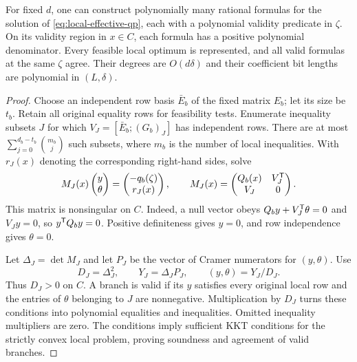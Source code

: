 \begin{lemma}\label{lem:local-branches}
For fixed $d$, one can construct polynomially many rational formulas
for the solution of \eqref{eq:local-effective-qp}, each with a polynomial
validity predicate in $\zeta$. On its validity region in $x\in C$, each
formula has a positive polynomial denominator. Every feasible local
optimum is represented, and all valid formulas at the same $\zeta$
agree. Their degrees are $O(d\delta)$ and their coefficient bit lengths
are polynomial in $(L,\delta)$.
\end{lemma}
\begin{proof}
Choose an independent row basis $\bar E_b$ of the fixed matrix $E_b$;
let its size be $t_b$. Retain all original equality rows for feasibility
tests. Enumerate inequality subsets $J$ for which
$V_J=[\bar E_b;(G_b)_J]$ has independent rows. There are at most
$\sum_{j=0}^{d_b-t_b}\binom{m_b}{j}$ such subsets, where $m_b$ is the
number of local inequalities. With $r_J(x)$ denoting the corresponding
right-hand sides, solve
\begin{equation}\label{eq:block-kkt-system}
 M_J(x)\begin{pmatrix}y\\\theta\end{pmatrix}
 =\begin{pmatrix}-q_b(\zeta)\\r_J(x)\end{pmatrix},\qquad
 M_J(x)=\begin{pmatrix}Q_b(x)&V_J^{\mathsf T}\\V_J&0\end{pmatrix}.
\end{equation}
This matrix is nonsingular on $C$. Indeed, a null vector obeys
$Q_b y+V_J^{\mathsf T}\theta=0$ and $V_Jy=0$, so $y^{\mathsf T} Q_by=0$.
Positive definiteness gives $y=0$, and row independence gives $\theta=0$.

Let $\Delta_J=\det M_J$ and let $P_J$ be the vector of Cramer
numerators for $(y,\theta)$. Use
\[
             D_J=\Delta_J^2,\qquad Y_J=\Delta_J P_J,
             \qquad (y,\theta)=Y_J/D_J.
\]
Thus $D_J>0$ on $C$. A branch is valid if its $y$ satisfies every
original local row and the entries of $\theta$ belonging to $J$ are
nonnegative. Multiplication by $D_J$ turns these conditions into
polynomial equalities and inequalities. Omitted inequality multipliers
are zero. The conditions imply sufficient KKT conditions for the strictly
convex local problem, proving soundness and agreement of valid branches.


\end{proof}
